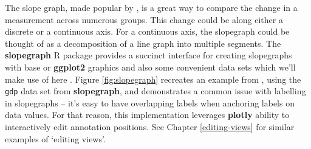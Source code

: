 \documentclass[
  12pt,
]{krantz}
\begin{document}
The slope graph, made popular by \citet{tufte2001}, is a great way to compare the change in a measurement across numerous groups. This change could be along either a discrete or a continuous axis. For a continuous axis, the slopegraph could be thought of as a decomposition of a line graph into multiple segments. The \textbf{slopegraph} R package provides a succinct interface for creating slopegraphs with base or \textbf{ggplot2} graphics and also some convenient data sets which we'll make use of here \citep{slopegraph}. Figure \ref{fig:slopegraph} recreates an example from \citet{tufte2001}, using the \texttt{gdp} data set from \textbf{slopegraph}, and demonstrates a common issue with labelling in slopegraphs -- it's easy to have overlapping labels when anchoring labels on data values. For that reason, this implementation leverages \textbf{plotly} ability to interactively edit annotation positions. See Chapter \ref{editing-views} for similar examples of `editing views'.
\end{document}
